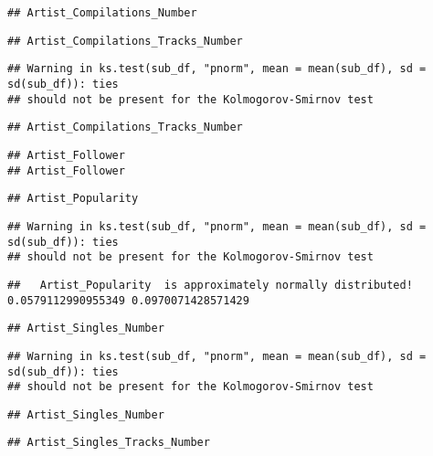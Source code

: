 \documentclass[
]{article}
\begin{document}
\begin{verbatim}
## Artist_Compilations_Number
\end{verbatim}

\begin{verbatim}
## Artist_Compilations_Tracks_Number
\end{verbatim}

\begin{verbatim}
## Warning in ks.test(sub_df, "pnorm", mean = mean(sub_df), sd = sd(sub_df)): ties
## should not be present for the Kolmogorov-Smirnov test
\end{verbatim}

\begin{verbatim}
## Artist_Compilations_Tracks_Number
\end{verbatim}

\begin{verbatim}
## Artist_Follower
## Artist_Follower
\end{verbatim}

\begin{verbatim}
## Artist_Popularity
\end{verbatim}

\begin{verbatim}
## Warning in ks.test(sub_df, "pnorm", mean = mean(sub_df), sd = sd(sub_df)): ties
## should not be present for the Kolmogorov-Smirnov test
\end{verbatim}

\begin{verbatim}
##   Artist_Popularity  is approximately normally distributed! 0.0579112990955349 0.0970071428571429
\end{verbatim}

\begin{verbatim}
## Artist_Singles_Number
\end{verbatim}

\begin{verbatim}
## Warning in ks.test(sub_df, "pnorm", mean = mean(sub_df), sd = sd(sub_df)): ties
## should not be present for the Kolmogorov-Smirnov test
\end{verbatim}

\begin{verbatim}
## Artist_Singles_Number
\end{verbatim}

\begin{verbatim}
## Artist_Singles_Tracks_Number
\end{verbatim}
\end{document}
